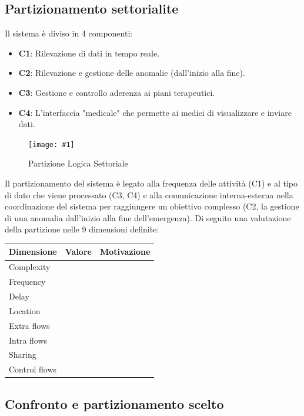 \documentclass[a4paper,11pt,oneside, table]{article}
\newcommand{\bigimage}[4] {
	\begin{figure}[H]
	    \centering
	    \texttt{[image: \#1]}
	    \caption{#2}\label{#3}
	\end{figure}
}
\begin{document}
\subsection{Partizionamento settorialite}

Il sistema \`e diviso in 4 componenti:
\begin{itemize}
  \item \textbf{C1}: Rilevazione di dati in tempo reale.
  \item \textbf{C2}: Rilevazione e gestione delle anomalie (dall'inizio alla fine).
  \item \textbf{C3}: Gestione e controllo aderenza ai piani terapeutici.
  \item \textbf{C4}: L'interfaccia "medicale" che permette ai medici di visualizzare e inviare dati.
\end{itemize}

\bigimage{images/Diagramma delle Attivita'/Partizione Logica Settoriale.png}{Partizione Logica Settoriale}{png:act:partizione-logica-settoriale}{1}

Il partizionamento del sistema \`e legato alla frequenza delle attivit\`a (C1) e al tipo di dato che viene processato (C3, C4) e alla comunicazione interna-esterna nella coordinazione del sistema per raggiungere un obiettivo complesso (C2, la gestione di una anomalia dall'inizio alla fine dell'emergenza).
Di seguito una valutazione della partizione nelle 9 dimensioni definite:

\begin{center}
  \begin{tabular}{|l | r | c|}
    \hline
    Dimensione & Valore & Motivazione \\
    \hline
    Complexity & & \\
    Frequency & & \\
    Delay & & \\
    Location & & \\
    Extra flows & & \\
    Intra flows & & \\
    Sharing & & \\
    Control flows & & \\
    \hline
  \end{tabular}
\end{center}

\subsection{Confronto e partizionamento scelto}
\end{document}
